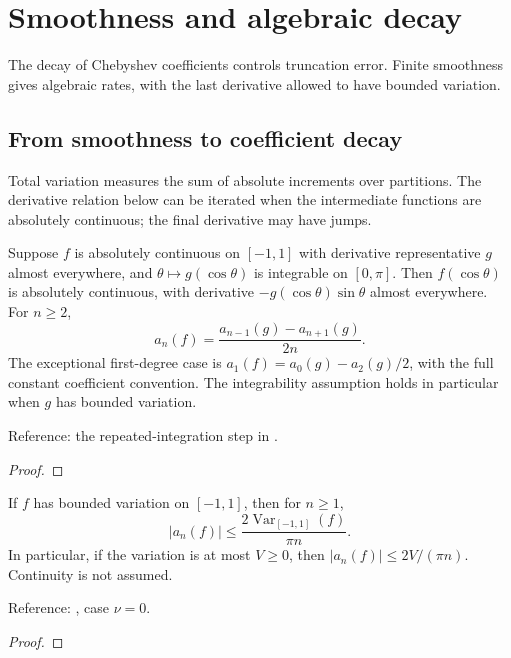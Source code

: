 \chapter{Smoothness and algebraic decay}\label{chap:smoothness}


The decay of Chebyshev coefficients controls truncation error. Finite smoothness gives algebraic rates, with the last derivative allowed to have bounded variation.

\section{From smoothness to coefficient decay}\label{sec:textbook-smoothness-decay}

Total variation measures the sum of absolute increments over partitions. The derivative relation below can be iterated when the intermediate functions are absolutely continuous; the final derivative may have jumps.

\begin{theorem}
\label{thm:derivative-coefficients}
\leanok
Suppose $f$ is absolutely continuous on $[-1,1]$ with derivative representative
$g$ almost everywhere, and $\theta\mapsto g(\cos\theta)$ is integrable on
$[0,\pi]$. Then $f(\cos\theta)$ is absolutely continuous, with derivative
$-g(\cos\theta)\sin\theta$ almost everywhere. For $n\ge2$,
\[
a_n(f)=\frac{a_{n-1}(g)-a_{n+1}(g)}{2n}.
\]
The exceptional first-degree case is $a_1(f)=a_0(g)-a_2(g)/2$,
with the full constant coefficient convention.
The integrability assumption holds in particular when $g$ has bounded variation.

Reference: the repeated-integration step in \cite[Chapter 7]{atap}.
\end{theorem}
\begin{proof}
\leanok
\end{proof}

\begin{theorem}
\label{thm:bv-coefficient-decay}
\leanok
If $f$ has bounded variation on $[-1,1]$, then for $n\ge1$,
\[
|a_n(f)|\le\frac{2\operatorname{Var}_{[-1,1]}(f)}{\pi n}.
\]
In particular, if the variation is at most $V\ge0$, then
$|a_n(f)|\le2V/(\pi n)$. Continuity is not assumed.

Reference: \cite[Theorem 7.1]{atap}, case $\nu=0$.
\end{theorem}
\begin{proof}
\leanok
\end{proof}

